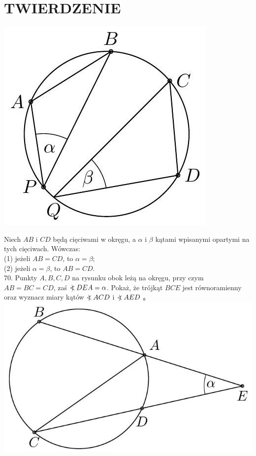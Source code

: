 \documentclass[10pt]{article}
\newcommand\Varangle{\mathop{{<\!\!\!\!\!\text{\small)}}\:}\nolimits}
\begin{document}
\section*{TWIERDZENIE}
\begin{center}
\includegraphics[max width=\textwidth]{2024_11_21_71f62bd117d375398909g-195(1)}
\end{center}

Niech \(A B\) i \(C D\) będą cięciwami w okręgu, a \(\alpha\) i \(\beta\) kątami wpisanymi opartymi na tych cięciwach. Wówczas:\\
(1) jeżeli \(A B=C D\), to \(\alpha=\beta\);\\
(2) jeżeli \(\alpha=\beta\), to \(A B=C D\).\\
70. Punkty \(A, B, C, D\) na rysunku obok leżą na okręgu, przy czym \(A B=B C=C D\), zaś \(\Varangle D E A=\alpha\). Pokaż, że trójkąt \(B C E\) jest równoramienny oraz wyznacz miary kątów \(\Varangle A C D\) i \(\Varangle A E D\) 。\\
\includegraphics[max width=\textwidth, center]{2024_11_21_71f62bd117d375398909g-195}
\end{document}

